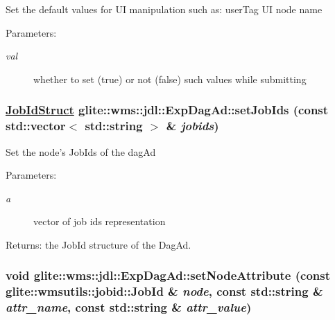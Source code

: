 Set the default values for UI manipulation such as: user\-Tag UI node name \begin{Desc}
\item[Parameters:]
\begin{description}
\item[{\em val}]whether to set (true) or not (false) such values while submitting \end{description}
\end{Desc}
\hypertarget{classglite_1_1wms_1_1jdl_1_1ExpDagAd_a19}{
\subsubsection[setJobIds]{\setlength{\rightskip}{0pt plus 5cm}\hyperlink{structglite_1_1wms_1_1jdl_1_1JobIdStruct}{Job\-Id\-Struct} glite::wms::jdl::Exp\-Dag\-Ad::set\-Job\-Ids (const std::vector$<$ std::string $>$ \& {\em jobids})}}
\label{classglite_1_1wms_1_1jdl_1_1ExpDagAd_a19}


Set the node's Job\-Ids of the dag\-Ad \begin{Desc}
\item[Parameters:]
\begin{description}
\item[{\em a}]vector of job ids representation \end{description}
\end{Desc}
\begin{Desc}
\item[Returns:]the Job\-Id structure of the Dag\-Ad. \end{Desc}
\hypertarget{classglite_1_1wms_1_1jdl_1_1ExpDagAd_a10}{
\subsubsection[setNodeAttribute]{\setlength{\rightskip}{0pt plus 5cm}void glite::wms::jdl::Exp\-Dag\-Ad::set\-Node\-Attribute (const glite::wmsutils::jobid::Job\-Id \& {\em node}, const std::string \& {\em attr\_\-name}, const std::string \& {\em attr\_\-value})}}
\label{classglite_1_1wms_1_1jdl_1_1ExpDagAd_a10}


